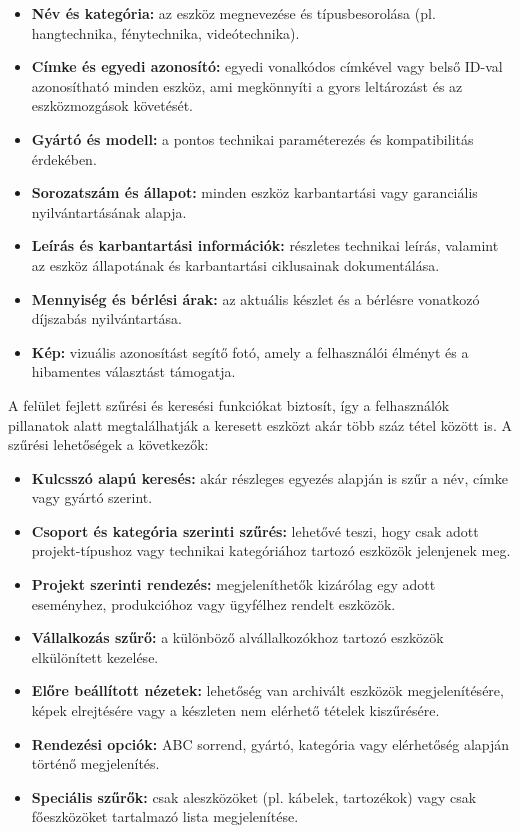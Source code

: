 \begin{itemize}
    \item \textbf{Név és kategória:} az eszköz megnevezése és típusbesorolása (pl. hangtechnika, fénytechnika, videótechnika).  
    \item \textbf{Címke és egyedi azonosító:} egyedi vonalkódos címkével vagy belső ID-val azonosítható minden eszköz, ami megkönnyíti a gyors leltározást és az eszközmozgások követését.
    \item \textbf{Gyártó és modell:} a pontos technikai paraméterezés és kompatibilitás érdekében.
    \item \textbf{Sorozatszám és állapot:} minden eszköz karbantartási vagy garanciális nyilvántartásának alapja.
    \item \textbf{Leírás és karbantartási információk:} részletes technikai leírás, valamint az eszköz állapotának és karbantartási ciklusainak dokumentálása.
    \item \textbf{Mennyiség és bérlési árak:} az aktuális készlet és a bérlésre vonatkozó díjszabás nyilvántartása.
    \item \textbf{Kép:} vizuális azonosítást segítő fotó, amely a felhasználói élményt és a hibamentes választást támogatja.
\end{itemize}

A felület fejlett szűrési és keresési funkciókat biztosít, így a felhasználók pillanatok alatt megtalálhatják a keresett eszközt akár több száz tétel között is.  
A szűrési lehetőségek a következők:

\begin{itemize}
    \item \textbf{Kulcsszó alapú keresés:} akár részleges egyezés alapján is szűr a név, címke vagy gyártó szerint.
    \item \textbf{Csoport és kategória szerinti szűrés:} lehetővé teszi, hogy csak adott projekt-típushoz vagy technikai kategóriához tartozó eszközök jelenjenek meg.
    \item \textbf{Projekt szerinti rendezés:} megjeleníthetők kizárólag egy adott eseményhez, produkcióhoz vagy ügyfélhez rendelt eszközök.
    \item \textbf{Vállalkozás szűrő:} a különböző alvállalkozókhoz tartozó eszközök elkülönített kezelése.
    \item \textbf{Előre beállított nézetek:} lehetőség van archivált eszközök megjelenítésére, képek elrejtésére vagy a készleten nem elérhető tételek kiszűrésére.
    \item \textbf{Rendezési opciók:} ABC sorrend, gyártó, kategória vagy elérhetőség alapján történő megjelenítés.
    \item \textbf{Speciális szűrők:} csak aleszközöket (pl. kábelek, tartozékok) vagy csak főeszközöket tartalmazó lista megjelenítése.
\end{itemize}


